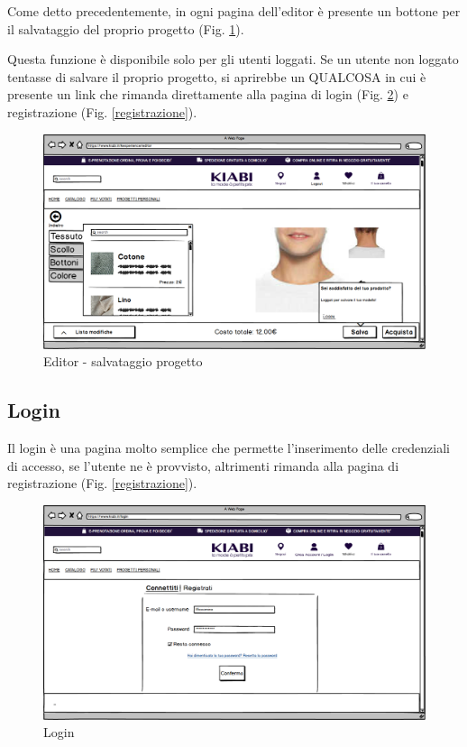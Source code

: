 \documentclass[12pt,italian,]{report}
\begin{document}
Come detto precedentemente, in ogni pagina dell'editor è presente un bottone per il salvataggio del proprio progetto (Fig. \ref{editor_salva}). 

Questa funzione è disponibile solo per gli utenti loggati. Se un utente non loggato tentasse di salvare il proprio progetto, si aprirebbe un QUALCOSA in cui è presente un link che rimanda direttamente alla pagina di login (Fig. \ref{login}) e registrazione (Fig. \ref{registrazione}).

\begin{figure}[h]
\centering
\includegraphics{balsamiq/Editor - caratteristica collo tessuto non loggato.png}
\caption{Editor - salvataggio progetto}
\label{editor_salva}
\end{figure}


\subsection{Login} 

Il login è una pagina molto semplice che permette l'inserimento delle credenziali di accesso, se l'utente ne è provvisto, altrimenti rimanda alla pagina di registrazione (Fig. \ref{registrazione}).

\begin{figure}[h]
\centering
\includegraphics{balsamiq/Login.png}
\caption{Login}
\label{login}
\end{figure}
\end{document}
